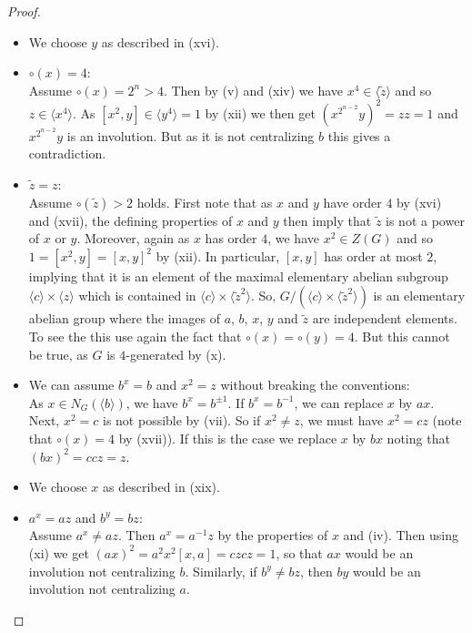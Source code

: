 \documentclass[a4paper,10pt]{amsart}
\theoremstyle{definition}
\theoremstyle{remark}
\begin{document}
\begin{proof}
\begin{itemize}
\item[Convention:] We choose $y$ as described in (xvi).

\item[(xvii)] $\circ(x) = 4$:\\
Assume $\circ(x) = 2^n > 4$. Then by (v) and (xiv) we have $x^4 \in \langle \tilde{z} \rangle$ and so $z \in \langle x^4 \rangle$. As $[x^2,y] \in \langle y^4 \rangle = 1$ by (xii) we then get $(x^{2^{n-2}}y)^2 = zz=1$ and $x^{2^{n-2}}y$ is an involution. But as it is not centralizing $b$ this gives a contradiction.

\item[(xviii)] $\tilde{z} = z$:\\
Assume $\circ(\tilde{z}) > 2$ holds. First note that as $x$ and $y$ have order $4$ by (xvi) and (xvii), the defining properties of $x$ and $y$ then imply that $\tilde{z}$ is not a power of $x$ or $y$. Moreover, again as $x$ has order $4$, we have $x^2 \in Z(G)$ and so $1 = [x^2,y] = [x,y]^2$ by (xii). In particular, $[x,y]$ has order at most $2$, implying that it is an element of the maximal elementary abelian subgroup $\langle c \rangle \times \langle z \rangle$ which is contained in $\langle c \rangle \times \langle \tilde{z}^2 \rangle$. So, $G/(\langle c \rangle \times \langle \tilde{z}^2 \rangle)$ is an elementary abelian group where the images of $a$, $b$, $x$, $y$ and $\tilde{z}$ are independent elements. To see the this use again the fact that $\circ(x) = \circ(y) = 4$. But this cannot be true, as $G$ is $4$-generated by (x).

\item[(xix)] We can assume $b^x = b$ and $x^2 = z$ without breaking the conventions:\\
As $x \in N_G(\langle b \rangle)$, we have $b^x = b^{\pm 1}$. If $b^x = b^{-1}$, we can replace $x$ by $ax$. Next, $x^2 = c$ is not possible by (vii). So if $x^2 \neq z$, we must have $x^2 = cz$ (note that $\circ(x) = 4$ by (xvii)). If this is the case we replace $x$ by $bx$ noting that $(bx)^2 = ccz = z$.

\item[Convention:] We choose $x$ as described in (xix).

\item[(xx)] $a^x = az$ and $b^y = bz$:\\
Assume $a^x \neq az$. Then $a^x = a^{-1}z$ by the properties of $x$ and (iv). Then using (xi) we get $(ax)^2 = a^2x^2[x,a] = czcz = 1$, so that $ax$ would be an involution not centralizing $b$. Similarly, if $b^y \neq bz$, then $by$ would be an involution not centralizing $a$.


\end{itemize}
\end{proof}
\end{document}
